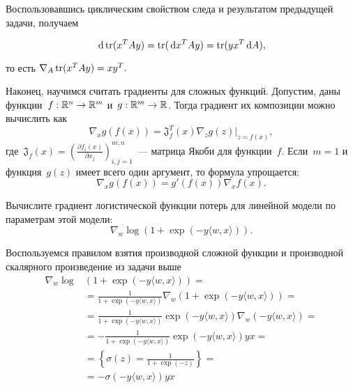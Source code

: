 \documentclass[12pt,fleqn]{article}
\newcommand{\dx}[1]{\,\mathrm{d}#1} %
\begin{document}
\begin{esSolution} Воспользовавшись циклическим свойством следа и результатом предыдущей задачи, получаем

\[ 
\dx{\Tr(x^TAy)} = \Tr(\dx{x^TAy}) = \Tr(yx^T\dx{A}),
\]

то есть $\nabla_A \mathop{\mathrm{tr}}(x^TAy) = xy^T.$
\end{esSolution}

Наконец, научимся считать градиенты для сложных функций.
Допустим, даны функции~$f: \mathbb{R}^n \to \mathbb{R}^m$ и~$g: \mathbb{R}^m \to \mathbb{R}$.
Тогда градиент их композиции можно вычислить как
\[
    \nabla_x g \left( f(x) \right)
    =
    \mathfrak{J}_{f}^T (x)
    \nabla_z \left. g(z) \right|_{z = f(x)},
\]
где~$\mathfrak{J}_f (x) = \left( \frac{\partial f_i(x)}{\partial x_j}  \right)_{i, j = 1}^{m, n}$~--- матрица Якоби для функции~$f$.
Если~$m = 1$ и функция~$g(z)$ имеет всего один аргумент, то формула упрощается:
\[
    \nabla_x g \left( f(x) \right)
    =
    g'(f(x))
    \nabla_x f(x).
\]


\begin{vkProblem}
    Вычислите градиент логистической функции потерь для линейной модели по параметрам этой модели:
    \[
        \nabla_w
        \log \left(
            1
            +
            \exp(-y \langle w, x \rangle)
        \right).
    \]
\end{vkProblem}

\begin{esSolution}
Воспользуемся правилом взятия производной сложной функции и производной скалярного произведение из задачи выше
    \begin{align*}
        \nabla_w
        \log &\left(
            1
            +
            \exp(-y \langle w, x \rangle)
        \right)
        = \\
        &=
        \frac{
            1
        }{
            1
            +
            \exp(-y \langle w, x \rangle)
        }
        \nabla_w \left(
            1
            +
            \exp(-y \langle w, x \rangle)
        \right)
        =\\
        &=
        \frac{
            1
        }{
            1
            +
            \exp(-y \langle w, x \rangle)
        }
        \exp(-y \langle w, x \rangle)
        \nabla_w \left(
            -y \langle w, x \rangle
        \right)
        =\\
        &=
        -
        \frac{
            1
        }{
            1
            +
            \exp(-y \langle w, x \rangle)
        }
        \exp(-y \langle w, x \rangle)
        y
        x
        =\\
        &=
        \left\{
            \sigma(z)
            =
            \frac{
                1
            }{
                1 + \exp(-z)
            }
        \right\}
        =\\
        &=
        -
        \sigma(-y \langle w, x \rangle)
        y
        x
    \end{align*}
\end{esSolution}
\end{document}
